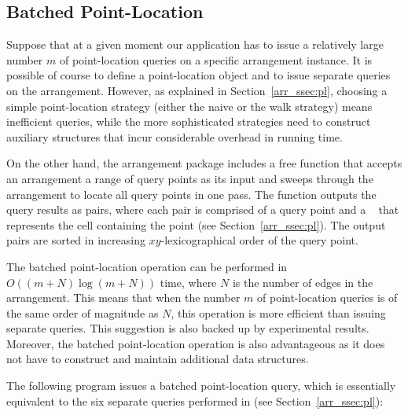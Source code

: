 \subsection{Batched Point-Location\label{arr_ssec:batched_pl}}

Suppose that at a given moment our application has to issue a
relatively large number $m$ of point-location queries on a
specific arrangement instance. It is possible of course to define
a point-location object and to issue separate queries on the
arrangement. However, as explained in Section~\ref{arr_ssec:pl},
choosing a simple point-location strategy (either the naive or
the walk strategy) means inefficient queries, while the more
sophisticated strategies need to construct auxiliary structures
that incur considerable overhead in running time.

On the other hand, the arrangement package includes a free
 function that accepts an arrangement a range of
query points as its input and sweeps through the arrangement to
locate all query points in one pass. The function outputs the query
results as pairs, where each pair is comprised of a query point
and a \cgal\  that represents the cell containing the
point (see Section~\ref{arr_ssec:pl}). The output pairs are
sorted in increasing $xy$-lexicographical order of the query point.

The batched point-location operation can be performed in
$O\left((m+N)\log{(m+N)}\right)$ time, where $N$ is the number of
edges in the arrangement. This means that when the number $m$ of
point-location queries is of the same order of magnitude as $N$,
this operation is more efficient than issuing separate queries.
This suggestion is also backed up by experimental results.
Moreover, the batched point-location operation is also
advantageous as it does not have to construct and maintain
additional data structures.

The following program issues a batched point-location query, which
is essentially equivalent to the six separate queries performed in
 (see Section~\ref{arr_ssec:pl}):

